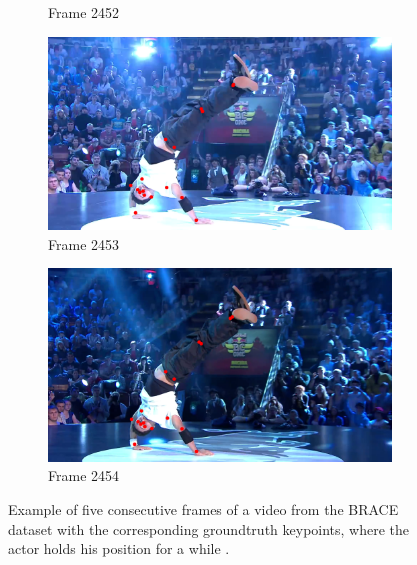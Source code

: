 \documentclass[./main.tex]{subfiles}
\begin{document}
\begin{figure}[htbp]
\begin{subfigure}{0.45\textwidth}
        \caption{Frame 2452}
    \end{subfigure}
    \begin{subfigure}{0.45\textwidth}
        \centering
        \includegraphics[width=\textwidth]{entities/BRACE_2453.png}
        \caption{Frame 2453}
    \end{subfigure}
    \begin{subfigure}{0.45\textwidth}
        \centering
        \includegraphics[width=\textwidth]{entities/BRACE_2454.png}
        \caption{Frame 2454}
    \end{subfigure}

    \caption{Example of five consecutive frames of a video from the BRACE dataset with the corresponding groundtruth keypoints, where the actor holds his position for a while \cite{BRACE}.}
    \label{fig:BRACE_dataset_static}
\end{figure}
\end{document}
